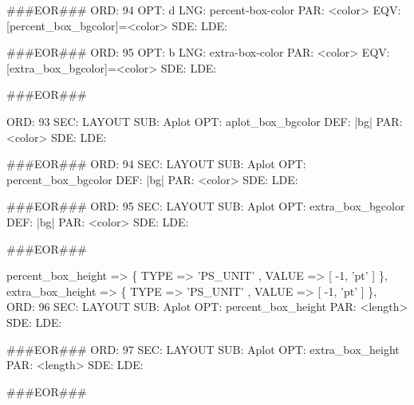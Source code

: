\documentclass[11pt]{article}
\def\nwendcode{\endtrivlist \endgroup} %
\let\nwdocspar=\par                    %
\begin{document}
###EOR###
ORD: 94
OPT: d
LNG: percent-box-color
PAR: <color>
EQV: [percent_box_bgcolor]=<color>
SDE: 
LDE: 

###EOR###
ORD: 95
OPT: b
LNG: extra-box-color
PAR: <color>
EQV: [extra_box_bgcolor]=<color>
SDE: 
LDE: 

###EOR###
\nwendcode{}\nwdocspar
\nwenddocs{}\plusendmoddef
ORD: 93
SEC: LAYOUT
SUB: Aplot
OPT: aplot_box_bgcolor
DEF: |bg|
PAR: <color>
SDE: 
LDE: 

###EOR###
ORD: 94
SEC: LAYOUT
SUB: Aplot
OPT: percent_box_bgcolor
DEF: |bg|
PAR: <color>
SDE: 
LDE: 

###EOR###
ORD: 95
SEC: LAYOUT
SUB: Aplot
OPT: extra_box_bgcolor
DEF: |bg|
PAR: <color>
SDE: 
LDE: 

###EOR###
\nwendcode{}\nwdocspar

\nwenddocs{}\plusendmoddef
percent_box_height        => \{ TYPE => 'PS_UNIT'  , VALUE => [ -1, 'pt' ] \},
extra_box_height          => \{ TYPE => 'PS_UNIT'  , VALUE => [ -1, 'pt' ] \},
\eatline
{}\nwendcode{}\plusendmoddef
ORD: 96
SEC: LAYOUT
SUB: Aplot
OPT: percent_box_height
PAR: <length>
SDE: 
LDE: 

###EOR###
ORD: 97
SEC: LAYOUT
SUB: Aplot
OPT: extra_box_height
PAR: <length>
SDE: 
LDE: 

###EOR###
\nwendcode{}\nwdocspar

\end{document}
